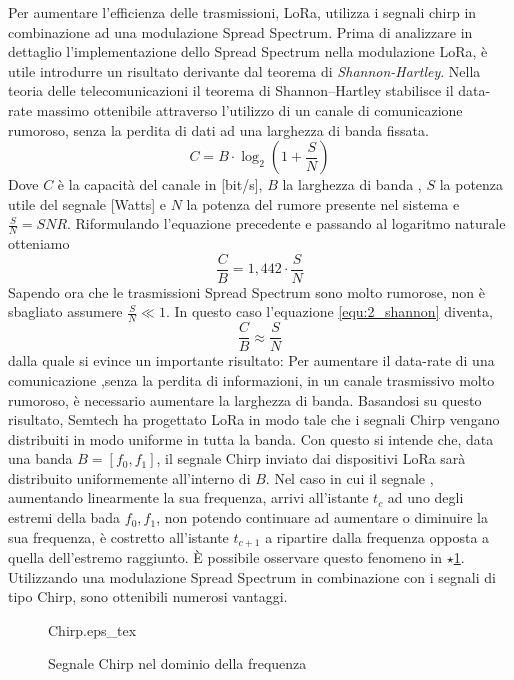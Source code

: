 Per aumentare l'efficienza delle trasmissioni, LoRa, utilizza i segnali chirp in
combinazione ad una modulazione Spread Spectrum. 
Prima di analizzare in dettaglio l'implementazione dello Spread Spectrum 
nella modulazione LoRa, è utile introdurre un risultato derivante dal teorema di
\textit{Shannon-Hartley}.
Nella teoria delle telecomunicazioni il teorema di Shannon–Hartley stabilisce il
data-rate massimo ottenibile attraverso l'utilizzo di un canale di comunicazione 
rumoroso, senza la perdita di dati ad una larghezza di banda fissata.
\begin{equation}
        C = B\cdot \log_2\left(1+\frac{S}{N}\right)
\end{equation}
Dove $C$ è la capacità del canale in [bit/s], $B$ la larghezza di banda , $S$ la
potenza utile del segnale  [Watts] e $N$ la potenza del rumore presente nel
sistema  e $\frac{S}{N}=SNR$.
Riformulando l'equazione precedente e passando al logaritmo naturale otteniamo
\begin{equation}\label{equ:2_shannon}
        \frac{C}{B} = 1,442 \cdot \frac{S}{N}
\end{equation}
Sapendo ora che le trasmissioni Spread Spectrum sono molto rumorose, non è
sbagliato assumere $\frac{S}{N} \ll 1$. In questo caso l'equazione \ref{equ:2_shannon}
diventa,
\begin{equation}
        \frac{C}{B} \approx \frac{S}{N}
\end{equation}
dalla quale si evince un importante risultato: Per aumentare il data-rate di una
comunicazione ,senza la perdita di informazioni, in un canale trasmissivo molto
rumoroso, è necessario aumentare la larghezza di banda. Basandosi su questo
risultato, Semtech ha progettato LoRa in modo tale che i segnali Chirp vengano
distribuiti in modo uniforme in tutta la banda. 
Con questo si intende che, data una banda $B =
[f_0,f_1]$, il segnale Chirp inviato dai dispositivi LoRa sarà distribuito
uniformemente all'interno di $B$. 
Nel caso in cui il segnale ,  aumentando linearmente la sua frequenza,
arrivi all'istante $t_c$ ad uno degli estremi della bada $f_0,f_1$, non potendo
continuare ad aumentare o diminuire la sua frequenza,
 è costretto all'istante $t_{c+1}$ a ripartire dalla frequenza opposta a quella
dell'estremo raggiunto. È possibile osservare questo fenomeno in
\hyperlink{label_in_fig_1}{$\star$}\ref{fig:chirp_freq}.
Utilizzando una modulazione Spread Spectrum in combinazione con i segnali di tipo
Chirp, sono ottenibili numerosi vantaggi.
\begin{figure}[h]
        \centering
                {Chirp.eps_tex}
        \caption{Segnale Chirp nel dominio della frequenza}
        \label{fig:chirp_freq}
\end{figure}
